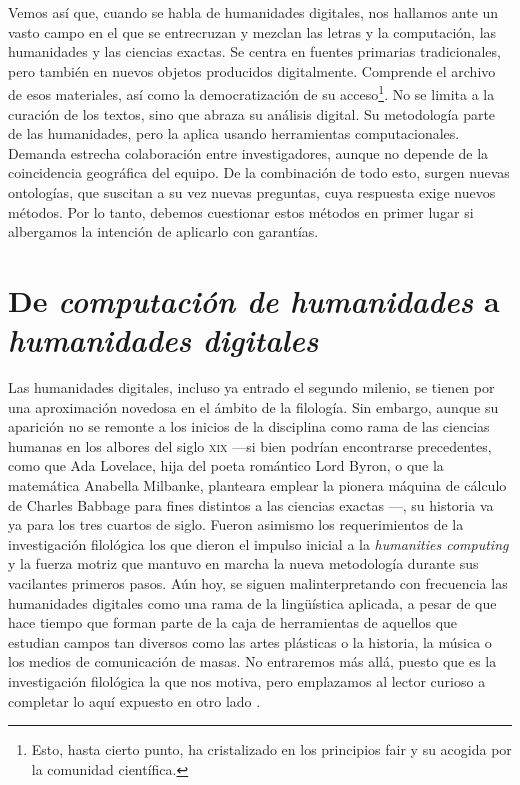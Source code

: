 Vemos así que, cuando se habla de humanidades digitales, nos hallamos ante un vasto campo en el que se entrecruzan y mezclan las letras y la computación, las humanidades y las ciencias exactas. Se centra en fuentes primarias tradicionales, pero también en nuevos objetos producidos digitalmente. Comprende el archivo de esos materiales, así como la democratización de su acceso\footnote{Esto, hasta cierto punto, ha cristalizado en los principios \acs{fair} \parencite{wilkinson2016} y su acogida por la comunidad científica.}. No se limita a la curación de los textos, sino que abraza su análisis digital. Su metodología parte de las humanidades, pero la aplica usando herramientas computacionales. Demanda estrecha colaboración  entre investigadores, aunque no depende de la coincidencia geográfica del equipo. De la combinación de todo esto, surgen nuevas ontologías, que suscitan a su vez nuevas preguntas, cuya respuesta exige nuevos métodos. Por lo tanto, debemos cuestionar estos métodos en primer lugar si albergamos la intención de aplicarlo con garantías.

\section{De \textit{computación de humanidades} a \textit{humanidades digitales}}
Las humanidades digitales, incluso ya entrado el segundo milenio, se tienen por una aproximación novedosa en el ámbito de la filología. Sin embargo, aunque su aparición no se remonte a los inicios de la disciplina como rama de las ciencias humanas en los albores del siglo \textsc{xix} —si bien podrían encontrarse precedentes, como que Ada Lovelace, hija del poeta romántico Lord Byron, o que la matemática Anabella Milbanke, planteara emplear la pionera máquina de cálculo de Charles Babbage para fines distintos a las ciencias exactas \parencite[153]{hernandez2022}—, su historia va ya para los tres cuartos de siglo. Fueron asimismo los requerimientos de la investigación filológica los que dieron el impulso inicial a la \textit{humanities computing} y la fuerza motriz que mantuvo en marcha la nueva metodología durante sus vacilantes primeros pasos. Aún hoy, se siguen malinterpretando con frecuencia las humanidades digitales como una rama de la lingüística aplicada, a pesar de que hace tiempo que forman parte de la caja de herramientas de aquellos que estudian campos tan diversos como las artes plásticas o la historia, la música o los medios de comunicación de masas. No entraremos más allá, puesto que es la investigación filológica la que nos motiva, pero emplazamos al lector curioso a completar lo aquí expuesto en otro lado \parencites{burdick2012}{berry2011b}{rio2014}{schreibman2004}.

